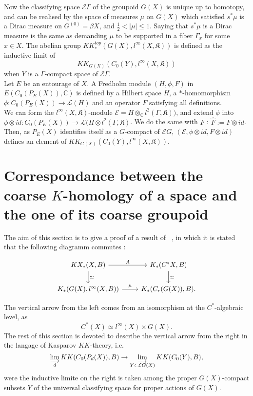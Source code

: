  Now the classifying space $\mathcal E \Gamma$ of the groupoid $G(X)$ is unique up to homotopy, and can be realised by the space of measures $\mu$ on $G(X)$ which satisfied $s^*  \mu$ is a Dirac measure on $G^{(0)}=\beta X$, and $\frac{1}{2}<|\mu|\leq 1$. Saying that $s^* \mu$ is a Dirac measure is the same as demanding $\mu$ to be supported in a fiber $\Gamma_x$ for some $x\in X$. The abelian group $KK^{top}_*(G(X),l^\infty (X, \mathfrak K))$ is defined as the inductive limit of 
\[KK_{G(X)}\left(C_0(Y),l^\infty (X,\mathfrak K)\right)\]
when $Y$ is a $\Gamma$-compact space of $\mathcal E \Gamma$.\\

Let $E$ be an entourage of $X$. A Fredholm module $(H, \phi,F)$ in $E(C_0(P_E(X)),\mathbb C)$ is defined by a Hilbert space $H$, a $*$-homomorphism $\phi : C_0(P_E(X))\rightarrow \mathcal L(H)$ and an operator $F$ satisfying all definitions. \\
We can form the $l^\infty (X,\mathfrak K)$-module $\mathcal E = H\otimes_{\mathbb C} l^2(\Gamma,\mathfrak K) )$, and extend $\phi$ into $\phi\otimes id : C_0(P_E(X))\rightarrow \mathcal L(H\otimes l^2(\Gamma,\mathfrak K)$. We do the same with $F$ : $\hat F := F\otimes id$.
Then, as $P_E(X)$ identifies itself as a $G$-compact of $\mathcal E G$, $(\mathcal E,\phi\otimes id,F\otimes id)$ defines an element of $KK_{G(X)}\left(C_0(Y),l^\infty (X,\mathfrak K)\right)$.



\section{Correspondance between the coarse $K$-homology of a space and the one of its coarse groupoid}

The aim of this section is to give a proof of a result of ~\cite{TuBC}, in which it is stated that the following diagramm commutes :

\[\begin{tikzcd}KX_* (X,B)\arrow{r}{A}\arrow{d}{\simeq} & K_*(C^*X,B) \arrow{d}{\simeq}\\
K_*(G(X),l^{\infty}(X,B))\arrow{r}{\mu} & K_*(C_r(G(X)),B).
\end{tikzcd}\]

The vertical arrow from the left comes from an isomorphism at the $C^*$-algebraic level, as
\[C^*(X) \simeq l^\infty(X)\times G(X).\] %
The rest of this section is devoted to describe the vertical arrow from the right in the langage of Kasparov $KK$-theory, i.e.
\[\varinjlim_d KK(C_0(P_d(X)),B)\rightarrow \varinjlim_{Y\subset \mathcal E G(X)} KK(C_0(Y),B),\]
were the inductive limite on the right is taken among the proper $G(X)$-compact subsets $Y$ of the universal classifying space for proper actions of $G(X)$.\\

